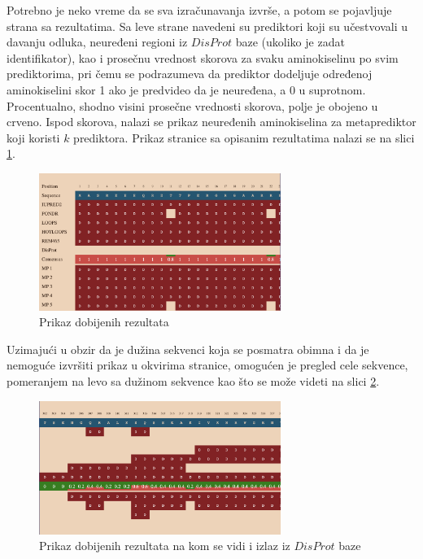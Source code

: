 Potrebno je neko vreme da se sva izračunavanja izvrše, a potom se pojavljuje strana sa rezultatima. Sa leve strane navedeni su prediktori koji su učestvovali u davanju odluka, neuređeni regioni iz $DisProt$ baze (ukoliko je zadat identifikator), kao i prosečnu vrednost skorova za svaku aminokiselinu po svim prediktorima, pri čemu se podrazumeva da prediktor dodeljuje određenoj aminokiselini skor 1 ako je predvideo da je neuređena, a 0 u suprotnom.	 Procentualno, shodno visini prosečne vrednosti skorova, polje je obojeno u crveno. Ispod skorova, nalazi se prikaz neuređenih aminokiselina za metaprediktor koji koristi $k$ prediktora. Prikaz stranice sa opisanim rezultatima nalazi se na slici \ref{fig:results}.
\begin{figure}[H]
	\centering
    \includegraphics[width=0.7\textwidth]{Figures/App/fourth_screen.png}
    \caption{Prikaz dobijenih rezultata}
    \label{fig:results}
\end{figure}
Uzimajući u obzir da je dužina sekvenci koja se posmatra obimna i da je nemoguće izvršiti prikaz u okvirima stranice, omogućen je pregled cele sekvence, pomeranjem na levo sa dužinom sekvence kao što se može videti na slici \ref{fig:disprotrez}.
\begin{figure}[H]
	\centering
    \includegraphics[width=0.7\textwidth]{Figures/App/fifth_screen.png}
    \caption{Prikaz dobijenih rezultata na kom se vidi i izlaz iz $DisProt$ baze}
    \label{fig:disprotrez}
\end{figure}

